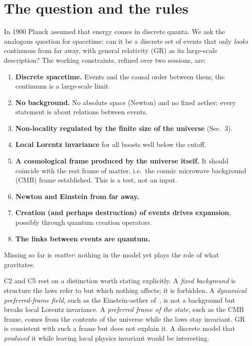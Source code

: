 \documentclass[11pt,a4paper]{article}
\newcommand{\tagbox}[2]{\textsf{\scriptsize\colorbox{#1!12}{\textcolor{#1!70!black}{#2}}}}
\newcommand{\est}{\tagbox{gray}{established}}
\begin{document}
\section{The question and the rules}
In 1900 Planck assumed that energy comes in discrete quanta. We ask the analogous question for spacetime: can it be a discrete set of events that only \emph{looks} continuous from far away, with general relativity (GR) as its large-scale description? The working constraints, refined over two sessions, are:
\begin{enumerate}[label=\textbf{C\arabic*},leftmargin=*,itemsep=1pt]
\item \textbf{Discrete spacetime.} Events and the causal order between them; the continuum is a large-scale limit.
\item \textbf{No background.} No absolute space (Newton) and no fixed aether; every statement is about relations between events.
\item \textbf{Non-locality regulated by the finite size of the universe} (Sec.~3).
\item \textbf{Local Lorentz invariance} for all boosts well below the cutoff.
\item \textbf{A cosmological frame produced by the universe itself.} It should coincide with the rest frame of matter, i.e.\ the cosmic microwave background (CMB) frame \est. This is a test, not an input.
\item \textbf{Newton and Einstein from far away.}
\item \textbf{Creation (and perhaps destruction) of events drives expansion}, possibly through quantum creation operators.
\item \textbf{The links between events are quantum.}
\end{enumerate}
Missing so far is \emph{matter}: nothing in the model yet plays the role of what gravitates.

C2 and C5 rest on a distinction worth stating explicitly. A \emph{fixed background} is structure the laws refer to but which nothing affects; it is forbidden. A \emph{dynamical preferred-frame field}, such as the Einstein-aether of~\cite{JacobsonMattingly01}, is not a background but breaks local Lorentz invariance. A \emph{preferred frame of the state}, such as the CMB frame, comes from the contents of the universe while the laws stay invariant. GR is consistent with such a frame but does not explain it. A discrete model that \emph{produced} it while leaving local physics invariant would be interesting.
\end{document}
